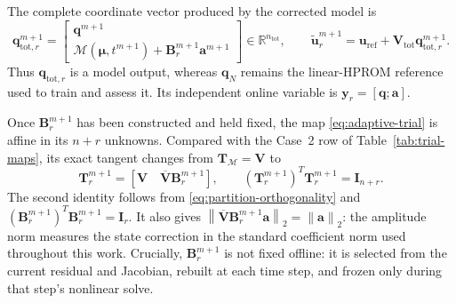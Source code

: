 \documentclass[11pt]{article}
\newcommand{\q}{\mathbf q}
\newcommand{\uvec}{\mathbf u}
\newcommand{\utilde}{\widetilde{\mathbf u}}
\newcommand{\mub}{\bm\mu}
\newcommand{\norm}[1]{\left\lVert #1 \right\rVert}
\begin{document}
The complete coordinate vector produced by the corrected model is
\begin{equation}
\mathbf q_{\mathrm{tot},r}^{m+1}=\begin{bmatrix}
\q^{m+1}\\
\mathcal M(\mub,t^{m+1})+\mathbf B_r^{m+1}\mathbf a^{m+1}
\end{bmatrix}\in\mathbb R^{n_{\mathrm{tot}}},\qquad
\utilde_r^{m+1}=\uvec_{\mathrm{ref}}+
\mathbf V_{\mathrm{tot}}\mathbf q_{\mathrm{tot},r}^{m+1}.
\label{eq:adaptive-complete-coordinates}
\end{equation}
Thus $\mathbf q_{\mathrm{tot},r}$ is a model output, whereas $\q_N$ remains
the linear-HPROM reference used to train and assess it.  Its independent
online variable is $\mathbf y_r=[\q;\mathbf a]$.

Once $\mathbf B_r^{m+1}$ has been constructed and held fixed, the map
\eqref{eq:adaptive-trial} is affine in its $n+r$ unknowns.  Compared with
the Case~2 row of Table~\ref{tab:trial-maps}, its exact tangent changes
from $\mathbf T_{\mathcal M}=\mathbf V$ to
\begin{equation}
\mathbf T_r^{m+1}=\left[\mathbf V\quad
\overline{\mathbf V}\mathbf B_r^{m+1}\right],\qquad
(\mathbf T_r^{m+1})^T\mathbf T_r^{m+1}=\mathbf I_{n+r}.
\label{eq:adaptive-tangent}
\end{equation}
The second identity follows from \eqref{eq:partition-orthogonality} and
$(\mathbf B_r^{m+1})^T\mathbf B_r^{m+1}=\mathbf I_r$.  It also gives
$\norm{\overline{\mathbf V}\mathbf B_r^{m+1}\mathbf a}_2
=\norm{\mathbf a}_2$: the amplitude norm measures the state correction in
the standard coefficient norm used throughout this work.
Crucially, $\mathbf B_r^{m+1}$ is not fixed offline: it is selected from
the current residual and Jacobian, rebuilt at each time step, and frozen
only during that step's nonlinear solve.
\end{document}
